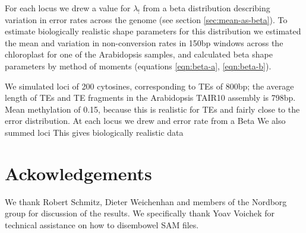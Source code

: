 \documentclass[12pt,longbibliography]{article}
\begin{document}
For each locus we drew a value for $\lambda_!$ from a beta distribution describing variation in error rates across the genome (see section \ref{sec:mean-as-beta}).
To estimate biologically realistic shape parameters for this distribution we estimated the mean and variation in non-conversion rates in 150bp windows across the chloroplast for one of the Arabidopsis samples, and calculated beta shape parameters by method of moments (equations \ref{eqn:beta-a}, \ref{eqn:beta-b}). 


We simulated loci of 200 cytosines, corresponding to TEs of 800bp; the average length of TEs and TE fragments in the Arabidopsis TAIR10 assembly is 798bp.
Mean methylation of 0.15, because this is realistic for TEs and fairly close to the error distribution.
At each locus we drew and error rate from a Beta
We also summed loci
This gives biologically realistic data


\section{Ackowledgements}

We thank Robert Schmitz, Dieter Weichenhan and members of the Nordborg group for discussion of the results.
We specifically thank Yoav Voichek for technical assistance on how to disembowel SAM files.

\printbibliography %
\end{document}
